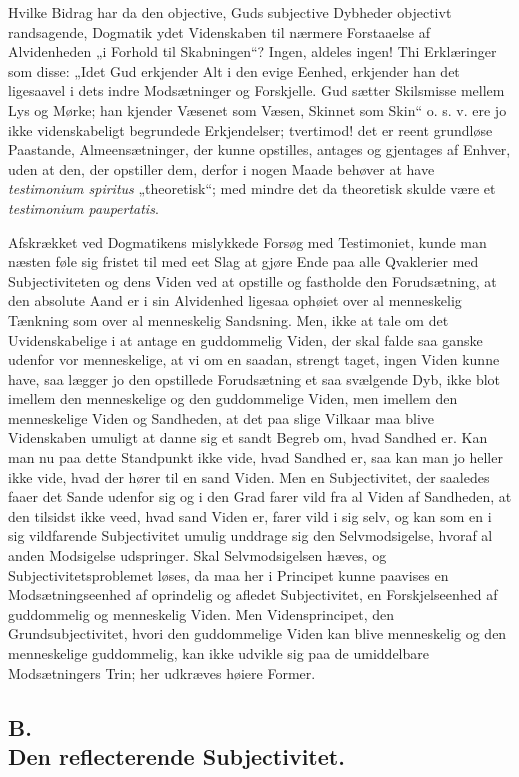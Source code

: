 \documentclass[11pt]{book}
\newcommand{\opage}[1]{\marginnote{\footnotesize\textit{[#1]}}}
\begin{document}
Hvilke Bidrag har da den objective, Guds subjective Dybheder
objectivt randsagende, Dogmatik ydet Videnskaben til nærmere
Forstaaelse af Alvidenheden „i Forhold til Skabningen“? Ingen,
aldeles ingen! Thi Erklæringer som disse: „Idet Gud erkjender Alt i
den evige Eenhed, erkjender han det ligesaavel i dets indre
Modsætninger og Forskjelle. Gud sætter Skilsmisse mellem Lys og
Mørke; han kjender Væsenet som Væsen, Skinnet som Skin“ o. s. v. ere
jo ikke videnskabeligt begrundede Erkjendelser; tvertimod! det er
reent grundløse Paastande, Almeensætninger, der kunne opstilles,
antages og gjentages af Enhver, uden at den, der opstiller dem,
derfor i nogen Maade
\opage{53} \setcounter{footnote}{0}%
behøver at have \textit{testimonium spiritus} „theoretisk“; med
mindre det da theoretisk skulde være et \textit{testimonium
paupertatis}.

Afskrækket ved Dogmatikens mislykkede Forsøg med Testimoniet, kunde
man næsten føle sig fristet til med eet Slag at gjøre Ende paa alle
Qvaklerier med Subjectiviteten og dens Viden ved at opstille og
fastholde den Forudsætning, at den absolute Aand er i sin Alvidenhed
ligesaa ophøiet over al menneskelig Tænkning som over al menneskelig
Sandsning. Men, ikke at tale om det Uvidenskabelige i at antage en
guddommelig Viden, der skal falde saa ganske udenfor vor
menneskelige, at vi om en saadan, strengt taget, ingen Viden kunne
have, saa lægger jo den opstillede Forudsætning et saa svælgende
Dyb, ikke blot imellem den menneskelige og den guddommelige Viden,
men imellem den menneskelige Viden og Sandheden, at det paa slige
Vilkaar maa blive Videnskaben umuligt at danne sig et sandt Begreb
om, hvad Sandhed er. Kan man nu paa dette Standpunkt ikke vide, hvad
Sandhed er, saa kan man jo heller ikke vide, hvad der hører til en
sand Viden. Men en Subjectivitet, der saaledes faaer det Sande
udenfor sig og i den Grad farer vild fra al Viden af Sandheden, at
den tilsidst ikke veed, hvad sand Viden er, farer vild i sig selv,
og kan som en i sig vildfarende Subjectivitet umulig unddrage sig
den Selvmodsigelse, hvoraf al anden Modsigelse udspringer. Skal
Selvmodsigelsen hæves, og Subjectivitetsproblemet løses, da maa her
i Principet kunne paavises en Modsætningseenhed af oprindelig og
afledet Subjectivitet, en Forskjelseenhed af guddommelig og
menneskelig Viden. Men Vidensprincipet, den Grundsubjectivitet,
hvori den guddommelige Viden kan blive menneskelig og den
menneskelige guddommelig, kan ikke udvikle sig paa de umiddelbare
Modsætningers Trin; her udkræves høiere Former.
\subsection*{B.\\ Den reflecterende Subjectivitet.}
\end{document}
